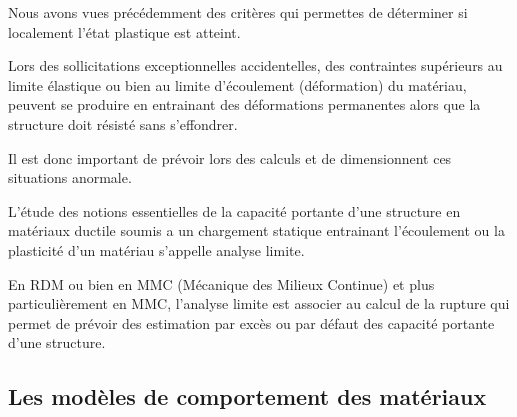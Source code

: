 \documentclass[12pt,a4paper]{report}
\begin{document}
	\vspace{\baselineskip}
	
	Nous avons vues précédemment des critères qui permettes de déterminer si localement l'état plastique est atteint.
	
	Lors des sollicitations exceptionnelles accidentelles, des contraintes supérieurs au limite élastique ou bien au limite d'écoulement (déformation) du matériau, peuvent se produire en entrainant des déformations permanentes alors que la structure doit résisté sans s'effondrer.
	
	\vspace{\baselineskip}
	
	Il est donc important de prévoir lors des calculs et de dimensionnent ces situations anormale.
	
	L'étude des notions essentielles de la capacité portante d'une structure en matériaux ductile soumis a un chargement statique entrainant l'écoulement ou la plasticité d'un matériau s'appelle analyse limite.
	
	\vspace{\baselineskip}
	
	En RDM ou bien en MMC (Mécanique des Milieux Continue) et plus particulièrement en MMC, l'analyse limite est associer au calcul de la rupture qui permet de prévoir des estimation par excès ou par défaut des capacité portante d'une structure.
	
	
	\subsection{Les modèles de comportement des matériaux}
	
	
	
	
	
\end{document}
